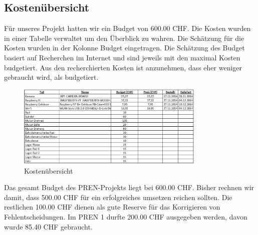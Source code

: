 

\subsection{Kostenübersicht}
Für unseres Projekt hatten wir ein Budget von 600.00 CHF. Die Kosten
wurden in einer Tabelle verwaltet um den Überblick zu wahren. Die
Schätzung für die Kosten wurden in der Kolonne Budget eingetragen. Die
Schätzung des Budget basiert auf Recherchen im Internet und sind jeweils
mit den maximal Kosten budgetiert. Aus den recherchierten Kosten ist anzunehmen, dass eher weniger gebraucht wird, als budgetiert.

\begin{figure}[h!]
	\center
	\includegraphics[width=0.8\textwidth]{../../fig/Kostenuebersicht.jpg}
	\caption{Kostenübersicht}
	\label{fig:Kostenuebersicht}
\end{figure}

Das gesamt Budget des PREN-Projekts liegt bei 600.00 CHF. Bisher rechnen
wir damit, dass 500.00 CHF für ein erfolgreiches umsetzen reichen sollten.
Die restlichen 100.00 CHF dienen als gute Reserve für das Korrigieren von
Fehlentscheidungen. Im PREN 1 durfte 200.00 CHF ausgegeben werden, davon
wurde 85.40 CHF gebraucht. 

\newpage







